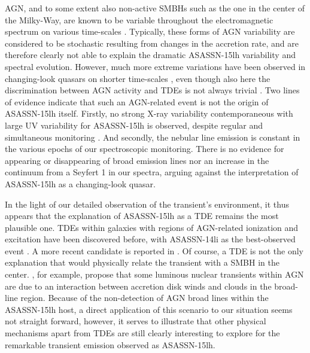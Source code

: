 \documentclass[traditabstract]{aa}
\begin{document}
AGN, and to some extent also non-active SMBHs such as the one in the center of the Milky-Way, are known to be variable throughout the electromagnetic spectrum on various time-scales \citep[e.g.,][]{1997ARA&A..35..445U, 2001Natur.413...45B}. Typically, these forms of AGN variability are considered to be stochastic resulting from changes in the accretion rate, and are therefore clearly not able to explain the dramatic ASASSN-15lh variability and spectral evolution. However, much more extreme variations have been observed in changing-look quasars on shorter time-scales \citep[e.g.,][]{2014ApJ...788...48S, 2015ApJ...800..144L, 2017ApJ...835..144G}, even though also here the discrimination between AGN activity and TDEs is not always trivial \citep{2015MNRAS.452...69M}. Two lines of evidence indicate that such an AGN-related event is not the origin of ASASSN-15lh itself. Firstly, no strong X-ray variability contemporaneous with large UV variability for ASASSN-15lh is observed, despite regular and simultaneous monitoring \citep{2016ApJ...828....3B, 2017ApJ...836...25M}. And secondly, the nebular line emission is constant in the various epochs of our spectroscopic monitoring. There is no evidence for appearing or disappearing of broad emission lines nor an increase in the continuum from a Seyfert 1 in our spectra, arguing against the interpretation of ASASSN-15lh as a changing-look quasar.

In the light of our detailed observation of the transient's environment, it thus appears that the explanation of ASASSN-15lh as a TDE \citep{2016NatAs...1E...2L, 2017ApJ...836...25M} remains the most plausible one. TDEs within galaxies with regions of AGN-related ionization and excitation have been discovered before, with ASASSN-14li as the best-observed event \citep{2016Sci...351...62V, 2016MNRAS.455.2918H, 2016ApJ...830L..32P}. A more recent candidate is reported in \citet{2017arXiv170307816B}. Of course, a TDE is not the only explanation that would physically relate the transient with a SMBH in the center. \citet{2017arXiv170606855M}, for example, propose that some luminous nuclear transients within AGN are due to an interaction between accretion disk winds and clouds in the broad-line region. Because of the non-detection of AGN broad lines within the ASASSN-15lh host, a direct application of this scenario to our situation seems not straight forward, however, it serves to illustrate that other physical mechanisms apart from TDEs are still clearly interesting to explore for the remarkable transient emission observed as ASASSN-15lh.
\end{document}
